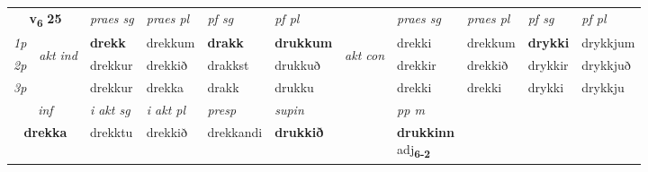 \noindent
\begin{tabular}{lllllllllll} \toprule
\multicolumn{2}{c}{\textbf{v{\textsubscript{6}}} \Large{\textbf{25}}}  &  \textit{praes sg}  & \textit{praes pl}  &\textit{ pf sg} & \textit{pf pl} &  &  \textit{praes sg}  & \textit{praes pl}  & \textit{pf sg} & \textit{pf pl } \\*
	\cmidrule{3-6} \cmidrule{8-11}
 {\textit{1p}} & \multirow{3}{*}{\begin{turn}{90}\textit{akt ind}\end{turn}} & \textbf{drekk} & drekkum & \textbf{drakk} & \textbf{drukkum} & \multirow{3}{*}{\begin{turn}{90}\textit{akt con}\end{turn}} &drekki & drekkum & \textbf{drykki} & drykkjum\\*
 {\textit{2p}} &  &  drekkur  & drekkið & drakkst & drukkuð & & drekkir & drekkið & drykkir & drykkjuð \\*
{\textit{3p}} &  & drekkur & drekka & drakk & drukku & & drekki & drekki& drykki & drykkju \\*
\cmidrule{3-6} \cmidrule{8-11}

   \multicolumn{2}{c}{\textit{inf}}  & \textit{i akt sg} & \textit{i akt pl}   & \textit{presp} & \textit{supin}  && \textit{pp m} \\*
  \multicolumn{2}{c}{\textbf{drekka}} & drekktu  & drekkið   & drekkandi &  \textbf{drukkið}  && \specialcell{\textbf{drukkinn} \\ adj\textbf{\textsubscript{6-2}}} \\*
\end{tabular}

